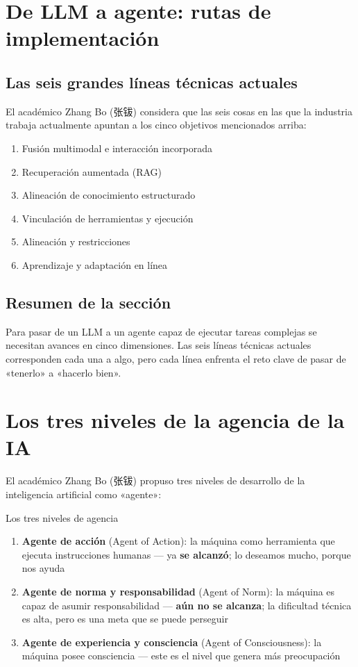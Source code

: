 \documentclass[a4paper]{article}
\begin{document}
\section{De LLM a agente: rutas de implementación}

\subsection{Las seis grandes líneas técnicas actuales}

El académico Zhang Bo (张钹) considera que las seis cosas en las que la industria trabaja actualmente apuntan a los cinco objetivos mencionados arriba:

\begin{enumerate}
\item Fusión multimodal e interacción incorporada
\item Recuperación aumentada (RAG)
\item Alineación de conocimiento estructurado
\item Vinculación de herramientas y ejecución
\item Alineación y restricciones
\item Aprendizaje y adaptación en línea
\end{enumerate}

\subsection{Resumen de la sección}

Para pasar de un LLM a un agente capaz de ejecutar tareas complejas se necesitan avances en cinco dimensiones. Las seis líneas técnicas actuales corresponden cada una a algo, pero cada línea enfrenta el reto clave de pasar de «tenerlo» a «hacerlo bien».

\section{Los tres niveles de la agencia de la IA}

El académico Zhang Bo (张钹) propuso tres niveles de desarrollo de la inteligencia artificial como «agente»:

\begin{importantbox}{Los tres niveles de agencia}
\begin{enumerate}
\item \textbf{Agente de acción} (Agent of Action): la máquina como herramienta que ejecuta instrucciones humanas — ya \textbf{se alcanzó}; lo deseamos mucho, porque nos ayuda
\item \textbf{Agente de norma y responsabilidad} (Agent of Norm): la máquina es capaz de asumir responsabilidad — \textbf{aún no se alcanza}; la dificultad técnica es alta, pero es una meta que se puede perseguir
\item \textbf{Agente de experiencia y consciencia} (Agent of Consciousness): la máquina posee consciencia — este es el nivel que genera más preocupación
\end{enumerate}
\end{importantbox}
\end{document}
